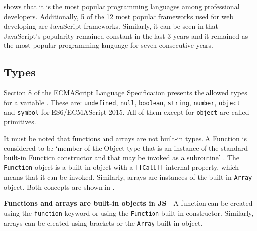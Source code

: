  shows that it is the most popular programming languages among professional developers. Additionally, 5 of the 12 most popular frameworks used for web developing are JavaScript frameworks. Similarly, it can be seen in  that JavaScript's popularity remained constant in the last 3 years and it remained as the most popular programming language for seven consecutive years.





\subsection{Types}
Section 8 of the ECMAScript Language Specification presents the allowed types for a variable \citep{ecma-script}. These are: \texttt{undefined}, \texttt{null}, \texttt{boolean}, \texttt{string}, \texttt{number}, \texttt{object} and \texttt{symbol} for ES6/ECMAScript 2015. All of them except for \texttt{object} are called primitives.

It must be noted that functions and arrays are not built-in types. A Function is considered to be `member of the Object type that is an instance of the standard built-in Function constructor and that may be invoked as a subroutine' \citep{ecma-script}. The \texttt{Function} object is a built-in object with a \texttt{[[Call]]} internal property, which means that it can be invoked. Similarly, arrays are instances of the built-in \texttt{Array} object. Both concepts are shown in .

\begin{code}
	\captionsetup{aboveskip=0pt, belowskip=10pt}
	\caption[Functions and arrays are built-in objects in JS]{\textbf{Functions and arrays are built-in objects in JS} - A function can be created using the \texttt{function} keyword or using the \texttt{Function} built-in constructor. Similarly, arrays can be created using brackets or the \texttt{Array} built-in object.}
	\label{code:background-functions-and-arrays}
\end{code}

